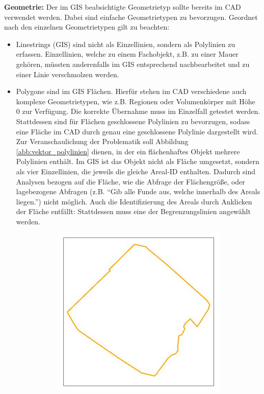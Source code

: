 {\bfseries Geometrie:} Der im GIS beabsichtigte Geometrietyp sollte bereits im CAD verwendet werden. Dabei sind einfache Geometrietypen zu bevorzugen. Geordnet nach den einzelnen Geometrietypen gilt zu beachten:
\begin{itemize}
	\item Linestrings (GIS) sind nicht als Einzellinien, sondern als Polylinien zu erfassen. Einzellinien, welche zu einem Fachobjekt, z.B. zu einer Mauer gehören, müssten anderenfalls im GIS entsprechend nachbearbeitet und zu einer Linie verschmolzen werden.
	\item Polygone sind im GIS Flächen. Hierfür stehen im CAD verschiedene auch komplexe Geometrietypen, wie z.B.  Regionen oder Volumenkörper mit Höhe 0 zur Verfügung. Die korrekte Übernahme muss im Einzelfall getestet werden. Stattdessen sind für Flächen geschlossene Polylinien zu bevorzugen, sodass eine Fläche im CAD durch genau eine geschlossene Polylinie dargestellt wird.\newline
	Zur Veranschaulichung der Problematik soll Abbildung \ref{abb:vektor_polylinien} dienen, in der ein flächenhaftes Objekt mehrere Polylinien enthält. Im GIS ist das Objekt nicht als Fläche umgesetzt, sondern als vier Einzellinien, die jeweils die gleiche Areal-ID enthalten. Dadurch sind Analysen bezogen auf die Fläche, wie die Abfrage der Flächengröße, oder lagebezogene Abfragen (z.B. "`Gib alle Funde aus, welche innerhalb des Areals liegen."') nicht möglich. Auch die Identifizierung des Areals durch Anklicken der Fläche entfällt: Stattdessen muss eine der Begrenzungslinien angewählt werden. 
\begin{figure}[h!tbp]\vspace{1cm}
\centering
\begin{subfigure}{.3\textwidth}
  \centering
  \includegraphics[width=\linewidth]{bilder/vektor_polylinienA}

\end{subfigure}
\end{figure}
\end{itemize}
